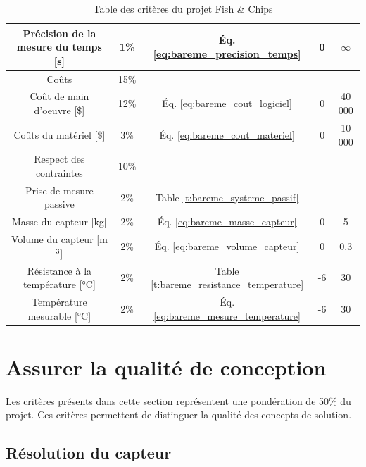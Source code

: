 \begin{table}[htp]
{\begin{tabular}{|c|c|c|c|c|}
        Précision de la mesure du temps [s] & 1\% & Éq. \ref{eq:bareme_precision_temps} & 0 & $\infty$\\
        \hline\hline
        Coûts & 15\% & & &\\
        \hline
        Coût de main d'oeuvre [\$] & 12\% & Éq. \ref{eq:bareme_cout_logiciel} & 0 & 40 000\\
        Coûts du matériel [\$] & 3\% & Éq. \ref{eq:bareme_cout_materiel} & 0 & 10 000 \\
        \hline\hline
        Respect des contraintes & 10\% & & & \\
        \hline
        Prise de mesure passive & 2\% & Table \ref{t:bareme_systeme_passif} & & \\
        Masse du capteur [kg] & 2\% & Éq. \ref{eq:bareme_masse_capteur} & 0 & 5 \\
        Volume du capteur [m$^3$] & 2\% & Éq. \ref{eq:bareme_volume_capteur} & 0 & 0.3\\
        Résistance à la température [°C] & 2\% & Table \ref{t:bareme_resistance_temperature} & -6 & 30\\
        Température mesurable [°C] & 2\% & Éq. \ref{eq:bareme_mesure_temperature} & -6 & 30\\
        \hline
   \end{tabular}}
    \caption{Table des critères du projet Fish \& Chips}
    \label{t:criteres}
\end{table}



\newpage{}

\section{Assurer la qualité de conception}
Les critères présents dans cette section représentent une pondération de 50\% du projet. Ces critères permettent de distinguer la qualité des concepts de solution.  

\subsection{Résolution du capteur}


